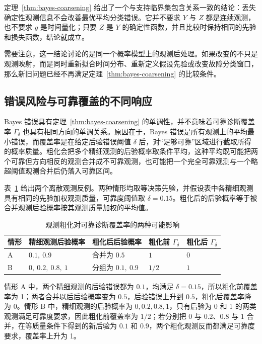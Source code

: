 \documentclass[master,fontset=ubuntu]{shnuthesis}
\theoremstyle{definition}
\begin{document}
定理~\ref{thm:bayes-coarsening} 给出了一个与支持临界集包含关系一致的结论：丢失确定性观测信息不会改善最优平均分类错误。它并不要求 \(Y\) 与 \(Z\) 都是连续观测，也不要求 \(g\) 是时间量化；只要 \(Z\) 是 \(Y\) 的确定性函数，并且比较时保持相同的先验和损失函数，结论就成立。

需要注意，这一结论讨论的是同一个概率模型上的观测后处理。如果改变的不只是观测映射，而是同时重新拟合时间分布、重新定义假设先验或改变故障分类窗口，那么新旧问题已经不再满足定理~\ref{thm:bayes-coarsening} 的比较条件。

\subsection{错误风险与可靠覆盖的不同响应}

Bayes 错误具有定理~\ref{thm:bayes-coarsening} 的单调性，并不意味着可靠诊断覆盖率 \(\Gamma_\delta\) 也具有相同方向的单调关系。原因在于，Bayes 错误是所有观测上的平均最小错误，而覆盖率是在给定后验错误阈值 \(\delta\) 后，对“足够可靠”区域进行截取所得的概率质量。粗化会把多个精细观测的后验概率取条件平均，这种平均既可能把两个可靠但方向相反的观测合并成不可靠观测，也可能把一个完全可靠观测与一个略超阈值观测合并后仍落入可靠区间。

表~\ref{tab:coverage-coarsening-examples} 给出两个离散观测反例。两种情形均取等决策先验，并假设表中各精细观测具有相同的先验加权观测质量，可靠度阈值取 \(\delta=0.15\)。粗化后的后验概率等于被合并观测后验概率按其观测质量加权的平均值。

\begin{table}[htbp]
\centering
\small
\caption{观测粗化对可靠诊断覆盖率的两种可能影响}
\label{tab:coverage-coarsening-examples}
\renewcommand{\arraystretch}{1.18}
\begin{tabularx}{\textwidth}{>{\centering\arraybackslash}p{1.0cm}>{\centering\arraybackslash}X>{\centering\arraybackslash}X>{\centering\arraybackslash}p{2.1cm}>{\centering\arraybackslash}p{2.1cm}}
\hline
情形 & 精细观测后验概率 & 粗化后后验概率 & 粗化前 \(\Gamma_\delta\) & 粗化后 \(\Gamma_\delta\)\\
\hline
A & \(0.1,\ 0.9\) & 合并为 \(0.5\) & \(1\) & \(0\)\\
B & \(0,\ 0.2,\ 0.8,\ 1\) & 分组为 \(0.1,\ 0.9\) & \(1/2\) & \(1\)\\
\hline
\end{tabularx}
\end{table}

情形 A 中，两个精细观测的后验错误都为 \(0.1\)，均满足 \(\delta=0.15\)，所以粗化前覆盖率为 1；两者合并以后后验概率变为 \(0.5\)，后验错误上升到 \(0.5\)，粗化后覆盖率降为 0。情形 B 中，精细观测的后验概率为 \(0,0.2,0.8,1\)，只有后验为 0 和 1 的两类观测满足可靠度要求，因此粗化前覆盖率为 \(1/2\)；若分别把 \(0\) 与 \(0.2\)、\(0.8\) 与 \(1\) 合并，在等质量条件下得到的新后验为 \(0.1\) 和 \(0.9\)，两个粗化观测反而都满足可靠度要求，覆盖率上升为 1。
\end{document}
